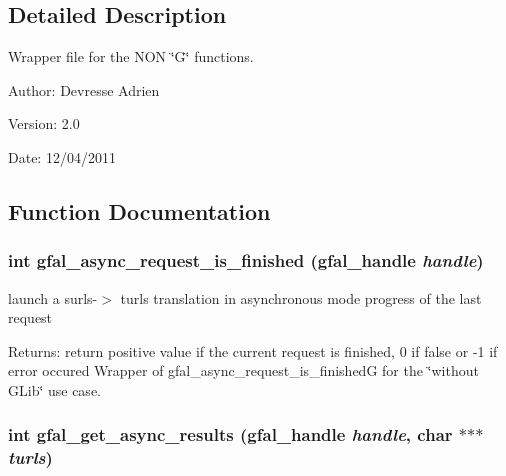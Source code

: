\subsection{Detailed Description}
Wrapper file for the NON \char`\"{}G\char`\"{} functions. 

\begin{Desc}
\item[Author:]Devresse Adrien \end{Desc}
\begin{Desc}
\item[Version:]2.0 \end{Desc}
\begin{Desc}
\item[Date:]12/04/2011 \end{Desc}


\subsection{Function Documentation}
\subsubsection{\setlength{\rightskip}{0pt plus 5cm}int gfal\_\-async\_\-request\_\-is\_\-finished (gfal\_\-handle {\em handle})}\label{gfal__common__interface_8c_ce6fcac8e92ad2e1d699eed2ce74a257}


launch a surls-$>$ turls translation in asynchronous mode progress of the last request 

\begin{Desc}
\item[Returns:]return positive value if the current request is finished, 0 if false or -1 if error occured Wrapper of gfal\_\-async\_\-request\_\-is\_\-finished\-G for the \char`\"{}without GLib\char`\"{} use case. \end{Desc}
\subsubsection{\setlength{\rightskip}{0pt plus 5cm}int gfal\_\-get\_\-async\_\-results (gfal\_\-handle {\em handle}, char $\ast$$\ast$$\ast$ {\em turls})}\label{gfal__common__interface_8c_0c654545b837b8e1928842ee762ce5e9}


